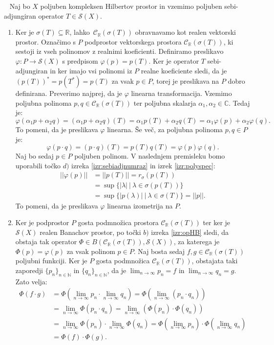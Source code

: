 \documentclass[12pt,a4paper,oneside,fleqn,openany]{book}
\newcommand{\eopf}{\raisebox{0.8ex}{\framebox{}}} %
\newenvironment{dokaz}%
{\noindent{\bf Dokaz.}\ }%
{\hfill\eopf\par\bigskip}%
\newcommand{\R}{\mathbb{R}}
\newcommand{\N}{\mathbb{N}}
\newcommand{\C}{\mathbb{C}}
\newcommand{\abs}[1]{\ensuremath{\lvert #1 \rvert}}
\newcommand{\norm}[1]{\abs{\abs{#1}}}
\newcommand{\map}[3]{\ensuremath{{#1}:{#2}\rightarrow{#3}}}
\begin{document}
\begin{dokaz}
	Naj bo $X$ poljuben kompleksen Hilbertov prostor in vzemimo poljuben sebi-adjungiran operator $T\in\mathcal{S}(X)$. \begin{enumerate}
		\item Ker je $\sigma(T)\subseteq\R$, lahko~$\mathcal{C}_\R(\sigma(T))$ obravnavamo kot realen vektorski prostor. Označimo s $P$ podprostor vektorskega prostora $\mathcal{C}_\R(\sigma(T))$, ki sestoji iz vseh polinomov z realnimi koeficienti. Definiramo preslikavo $\map{\varphi}{P}{\mathcal{S}(X)}$ s predpisom $\varphi(p) = p(T)$. Ker je operator $T$ sebi-adjungiran in ker imajo vsi polinomi iz $P$ realne koeficiente sledi, da je $(p(T))^* = p(T^*) = p(T)$ za vsak $p\in P$, torej je preslikava na $P$ dobro definirana. Preverimo najprej, da je $\varphi$ linearna transformacija. Vzemimo poljubna polinoma $p, q\in \mathcal{C}_\R(\sigma(T))$ ter poljubna skalarja $\alpha_1,\alpha_2\in\C$. Tedaj je: $$\varphi(\alpha_1p+\alpha_2q) =(\alpha_1p + \alpha_2q)(T) = \alpha_1p(T) + \alpha_2q(T) = \alpha_1\varphi(p) + \alpha_2\varphi(q).$$
		To pomeni, da je preslikava $\varphi$ linearna. Še več, za poljubna polinoma $p, q\in P$ je: $$\varphi(p\cdot q) = (p\cdot q)(T) = p(T)q(T) = \varphi(p)\varphi(q).$$ Naj bo sedaj $p\in P$ poljuben polinom. V naslednjem premisleku bomo uporabili točko $d)$ izreka \ref{izr:sebiadjnumraz} in izrek \ref{izr:polyspec}: \begin{align*}
			\norm{\varphi(p)} &= \norm{p(T)} = r_\sigma(p(T)) \\
			&= \sup\{\abs{\lambda}~|~\lambda\in\sigma(p(T))\} \\ &= \sup\{\abs{p(\lambda)}~|~\lambda\in\sigma(T)\} = \norm{p}.
		\end{align*}
		To pomeni, da je preslikava $\varphi$ linearna izometrija na $P$. 
		\item Ker je podprostor $P$ gosta podmnožica prostora $\mathcal{C}_\R(\sigma(T))$ ter ker je $\mathcal{S}(X)$ realen Banachov prostor, po točki $b)$ izreka \ref{izr:opHB} sledi, da obstaja tak operator $\Phi\in B(\mathcal{C}_\R(\sigma(T)), \mathcal{S}(X))$, za katerega je $\Phi(p) = \varphi(p)$ za vsak polinom $p\in P$. Naj bosta sedaj $f, g\in \mathcal{C}_\R(\sigma(T))$ poljubni funkciji. Ker je $P$ gosta podmnožica $\mathcal{C}_\R(\sigma(T))$, obstajata taki zaporedji $\{p_n\}_{n\in\N}$ in $\{q_n\}_{n\in\N}$, da je $\lim_{n\to\infty}p_n = f$ in $\lim_{n\to\infty}q_n = g$. Zato velja: \begin{align*}
			\Phi(f\cdot g) &= \Phi\left(\lim_{n\to \infty}p_n \cdot \lim_{n\to\infty}q_n\right) = \Phi\left(\lim_{n\to \infty}(p_n \cdot q_n)\right) \\ &= \lim_{n\to \infty}\Phi(p_n\cdot q_n) = \lim_{n\to \infty}(\Phi(p_n)\cdot \Phi(q_n)) \\ &= \lim_{n\to \infty}\Phi(p_n) \cdot \lim_{n\to \infty}\Phi(q_n) = \Phi\left(\lim_{n\to \infty}p_n\right) \cdot \Phi\left(\lim_{n\to \infty}q_n\right) \\ &= \Phi(f) \cdot \Phi(g).
		\end{align*}
	\end{enumerate}
\end{dokaz}
\end{document}
